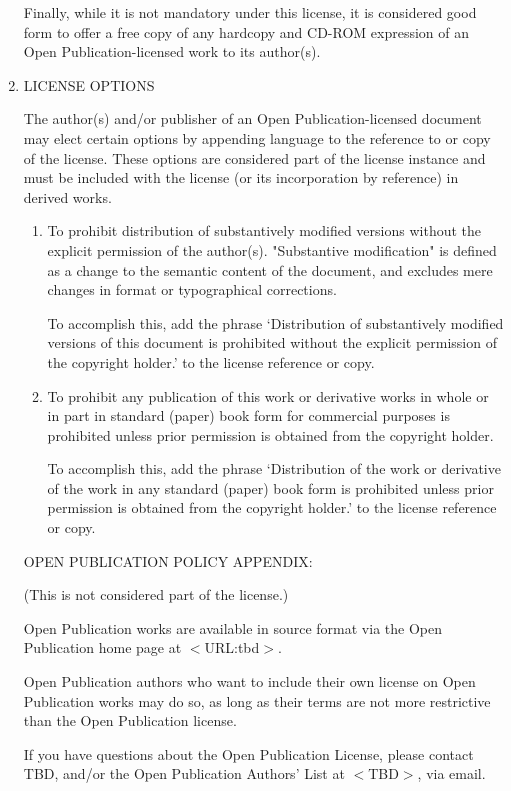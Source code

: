 \begin{enumerate}
Finally, while it is not mandatory under this license, it is considered
good form to offer a free copy of any hardcopy and CD-ROM expression of
an Open Publication-licensed work to its author(s).

\item LICENSE OPTIONS

The author(s) and/or publisher of an Open Publication-licensed document
may elect certain options by appending language to the reference to or
copy of the license. These options are considered part of the license
instance and must be included with the license (or its incorporation by
reference) in derived works.

\renewcommand{\labelenumi}{\Alph{enumi}.}
\begin{enumerate}
\item To prohibit distribution of substantively modified versions without
   the explicit permission of the author(s). "Substantive modification"
   is defined as a change to the semantic content of the document, and
   excludes mere changes in format or typographical corrections. 

   To accomplish this, add the phrase `Distribution of substantively
   modified versions of this document is prohibited without the explicit
   permission of the copyright holder.' to the license reference or
   copy. 

\item To prohibit any publication of this work or derivative works in whole
   or in part in standard (paper) book form for commercial purposes is
   prohibited unless prior permission is obtained from the copyright
   holder.

   To accomplish this, add the phrase `Distribution of the work or
   derivative of the work in any standard (paper) book form is
   prohibited unless prior permission is obtained from the copyright
   holder.' to the license reference or copy. 
\end{enumerate}

OPEN PUBLICATION POLICY APPENDIX:

(This is not considered part of the license.)

Open Publication works are available in source format via the Open
Publication home page at $<$URL:tbd$>$.

Open Publication authors who want to include their own license on Open
Publication works may do so, as long as their terms are not more
restrictive than the Open Publication license.

If you have questions about the Open Publication License, please contact
TBD, and/or the Open Publication Authors' List at $<$TBD$>$, via email.
\end{enumerate}
